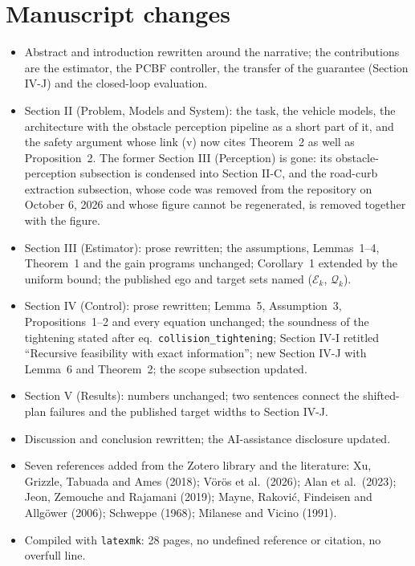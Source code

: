 \documentclass[11pt]{article}
\begin{document}
\section{Manuscript changes}
\begin{itemize}
\item Abstract and introduction rewritten around the narrative; the
  contributions are the estimator, the PCBF controller, the transfer of the
  guarantee (Section IV-J) and the closed-loop evaluation.
\item Section II (Problem, Models and System): the task, the vehicle models,
  the architecture with the obstacle perception pipeline as a short part of
  it, and the safety argument whose link (v) now cites Theorem~2 as well as
  Proposition~2. The former Section III (Perception) is gone: its
  obstacle-perception subsection is condensed into Section II-C, and the
  road-curb extraction subsection, whose code was removed from the repository
  on October 6, 2026 and whose figure cannot be regenerated, is removed
  together with the figure.
\item Section III (Estimator): prose rewritten; the assumptions, Lemmas~1--4,
  Theorem~1 and the gain programs unchanged; Corollary~1 extended by the
  uniform bound; the published ego and target sets named ($\mathcal E_k$,
  $\mathcal Q_k$).
\item Section IV (Control): prose rewritten; Lemma~5, Assumption~3,
  Propositions~1--2 and every equation unchanged; the soundness of the
  tightening stated after eq.\ \texttt{collision\_tightening}; Section IV-I
  retitled ``Recursive feasibility with exact information''; new Section IV-J
  with Lemma~6 and Theorem~2; the scope subsection updated.
\item Section V (Results): numbers unchanged; two sentences connect the
  shifted-plan failures and the published target widths to Section IV-J.
\item Discussion and conclusion rewritten; the AI-assistance disclosure
  updated.
\item Seven references added from the Zotero library and the literature:
  Xu, Grizzle, Tabuada and Ames (2018); V\"or\"os et al.\ (2026); Alan et al.\
  (2023); Jeon, Zemouche and Rajamani (2019); Mayne, Rakovi\'c, Findeisen and
  Allg\"ower (2006); Schweppe (1968); Milanese and Vicino (1991).
\item Compiled with \texttt{latexmk}: 28 pages, no undefined reference or
  citation, no overfull line.
\end{itemize}
\end{document}
